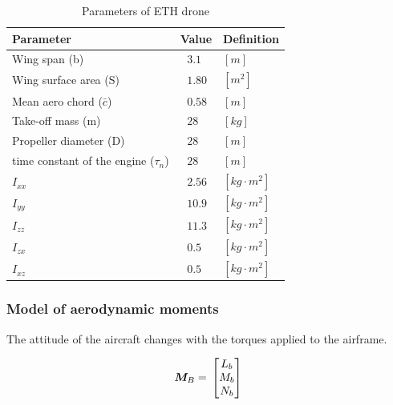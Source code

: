  \begin{table}
\caption{Parameters of ETH drone \cite{bronz2016aerodynamic}}
\label{arm:ethDrone}
\begin{center}
\begin{tabular}{ ||p{6cm}|p{3cm}|p{2cm}||}\hline
\textbf{Parameter} & \textbf{Value} & \textbf{Definition} \\\hline
Wing span (b)                & $\ \ \, 3.1 $	   & $[m]$ \\\hline
Wing surface area (S)      & $ \ \ \, 1.80$           &  $[m^2]$ \\\hline
Mean aero chord ($\bar{c}$)          & $\ \ \, 0.58$           & $[m]$ \\\hline
Take-off mass (m)             & $\ \ \, 28$       & $[kg]$ \\\hline
Propeller diameter (D)           & $\ \ \, 28$       & $[m]$ \\\hline
time constant of the engine ($\tau_n$)           & $\ \ \, 28$       & $[m]$ \\\hline
$I_{xx}$                         & $\ \ \, 2.56$   & $[kg \cdot m^2]$ \\\hline
$I_{yy}$                         & $\ \ \, 10.9$   & $[kg \cdot m^2]$ \\\hline
$I_{zz}$                         & $\ \ \, 11.3$   & $[kg \cdot m^2]$ \\\hline
$I_{zx}$                         & $\ \ \, 0.5$   & $[kg \cdot m^2]$ \\\hline
$I_{xz}$                         & $\ \ \, 0.5$   & $[kg \cdot m^2]$ \\\hline
\end{tabular}
\end{center}
\end{table}

\subsubsection{Model of aerodynamic moments}

The attitude of the aircraft changes with the torques applied to the airframe. 

\begin{equation}{\label{eqn:torqueTotal}}
\bm{M}_B
= \,
\begin{bmatrix}
L_{b} \\
M_{b}\\
N_{b}\\
\end{bmatrix}
\end{equation}

